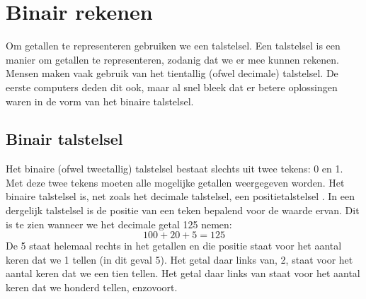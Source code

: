


\section{Binair rekenen}

Om getallen te representeren gebruiken we een talstelsel. Een talstelsel is een manier om getallen te representeren, zodanig dat we er mee kunnen rekenen. Mensen maken vaak gebruik van het tientallig (ofwel decimale) talstelsel. De eerste computers deden dit ook, maar al snel bleek dat er betere oplossingen waren in de vorm van het binaire talstelsel.

\subsection{Binair talstelsel}

Het binaire (ofwel tweetallig) talstelsel bestaat slechts uit twee tekens: 0 en 1. Met deze twee tekens moeten alle mogelijke getallen weergegeven worden. Het binaire talstelsel is, net zoals het decimale talstelsel, een positietalstelsel \cite{ou-diwi}. In een dergelijk talstelsel is de positie van een teken bepalend voor de waarde ervan. Dit is te zien wanneer we het decimale getal 125 nemen:
\[
    100 + 20 + 5 = 125
\]
De 5 staat helemaal rechts in het getallen en die positie staat voor het aantal keren dat we 1 tellen (in dit geval 5). Het getal daar links van, 2, staat voor het aantal keren dat we een tien tellen. Het getal daar links van staat voor het aantal keren dat we honderd tellen, enzovoort.


